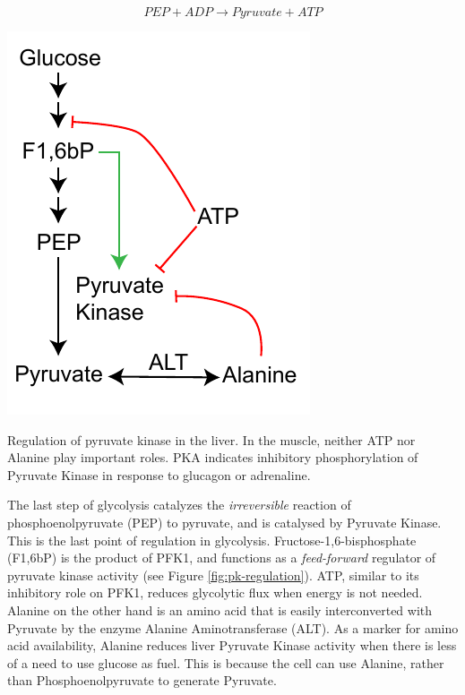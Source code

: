 \documentclass{tufte-handout}
\begin{document}
\begin{equation}\label{eq:pk}
PEP + ADP \rightarrow Pyruvate + ATP
\end{equation}

\begin{marginfigure}
\includegraphics{figures/pk-regulation.pdf}
\caption{Regulation of pyruvate kinase in the liver.  In the muscle, neither ATP nor Alanine play important roles.  PKA indicates inhibitory phosphorylation of Pyruvate Kinase in response to glucagon or adrenaline.}
\label{fig:pk-regulation}
\end{marginfigure}

The last step of glycolysis catalyzes the \emph{irreversible} reaction of phosphoenolpyruvate (PEP) to pyruvate, and is catalysed by Pyruvate Kinase.  This is the last point of regulation in glycolysis.    Fructose-1,6-bisphosphate (F1,6bP) is the product of PFK1, and functions as a \emph{feed-forward} regulator of pyruvate kinase activity (see Figure \ref{fig:pk-regulation}).  ATP, similar to its inhibitory role on PFK1, reduces glycolytic flux when energy is not needed.  Alanine on the other hand is an amino acid that is easily interconverted with Pyruvate by the enzyme Alanine Aminotransferase (ALT).  As a marker for amino acid availability, Alanine reduces liver Pyruvate Kinase activity when there is less of a need to use glucose as fuel.  This is because the cell can use Alanine, rather than Phosphoenolpyruvate to generate Pyruvate.
\end{document}

